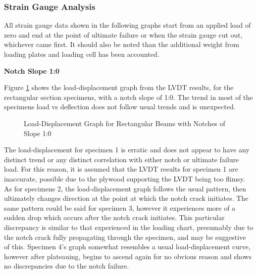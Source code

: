\documentclass[11pt,a4paper]{article}
\numberwithin{equation}{subsection}
\begin{document}
\subsubsection{Strain Gauge Analysis}
All strain gauge data shown in the following graphs start from an applied load of zero and end at the point of ultimate failure or when the strain gauge cut out, whichever came first. It should also be noted than the additional weight from loading plates and loading cell has been accounted. 

\vspace*{\baselineskip}

\noindent
\textbf{Notch Slope 1:0}\par
\noindent
Figure \ref{fig:Rect_10_def} shows the load-displacement graph from the LVDT results, for the rectangular section specimens, with a notch slope of 1:0. The trend in most of the specimens load vs deflection does not follow usual trends and is unexpected.
\begin{figure}[h]
	\begin{center}
	\end{center}
	\caption{Load-Displacement Graph for Rectangular Beams with Notches of Slope 1:0}
	\label{fig:Rect_10_def}
\end{figure}

\pagebreak

\noindent
The load-displacement for specimen 1 is erratic and does not appear to have any distinct trend or any distinct correlation with either notch or ultimate failure load. For this reason, it is assumed that the LVDT results for specimen 1 are inaccurate, possible due to the plywood supporting the LVDT being too flimsy. As for specimens 2, the load-displacement graph follows the usual pattern, then ultimately changes direction at the point at which the notch crack initiates. The same pattern could be said for specimen 3, however it experiences more of a sudden drop which occurs after the notch crack initiates. This particular discrepancy is similar to that experienced in the loading chart, presumably due to the notch crack fully propagating through the specimen, and may be suggestive of this. Specimen 4's graph somewhat resembles a usual load-displacement curve, however after plateauing, begins to ascend again for no obvious reason and shows no discrepancies due to the notch failure.   
\end{document}
